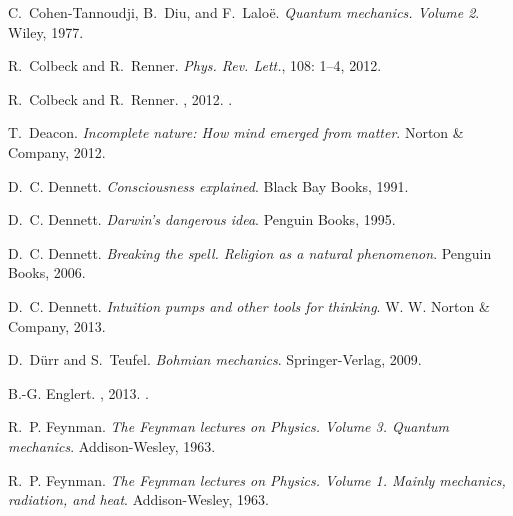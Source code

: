 \documentclass[a4paper,12pt]{article}
\begin{document}
\begin{thebibliography}{63}
C.~Cohen-Tannoudji, B.~Diu, and F.~Lalo\"{e}.
\newblock \emph{{Quantum mechanics. Volume 2}}.
\newblock Wiley, 1977{}.

R.~Colbeck and R.~Renner.
\newblock \emph{Phys. Rev. Lett.}, 108: 1--4, 2012{}.

R.~Colbeck and R.~Renner.
, 2012{}.
.

T.~Deacon.
\newblock \emph{{Incomplete nature: How mind emerged from matter}}.
\newblock Norton \& Company, 2012.

D.~C. Dennett.
\newblock \emph{{Consciousness explained}}.
\newblock Black Bay Books, 1991.

D.~C. Dennett.
\newblock \emph{{Darwin's dangerous idea}}.
\newblock Penguin Books, 1995.

D.~C. Dennett.
\newblock \emph{{Breaking the spell. Religion as a natural phenomenon}}.
\newblock Penguin Books, 2006.

D.~C. Dennett.
\newblock \emph{{Intuition pumps and other tools for thinking}}.
\newblock W. W. Norton \& Company, 2013.

D.~D\"{u}rr and S.~Teufel.
\newblock \emph{{Bohmian mechanics}}.
\newblock Springer-Verlag, 2009.

B.-G. Englert.
, 2013.
.

R.~P. Feynman.
\newblock \emph{{The Feynman lectures on Physics. Volume 3. Quantum
  mechanics}}.
\newblock Addison-Wesley, 1963{}.

R.~P. Feynman.
\newblock \emph{{The Feynman lectures on Physics. Volume 1. Mainly mechanics,
  radiation, and heat}}.
\newblock Addison-Wesley, 1963{}.


\end{thebibliography}
\end{document}
